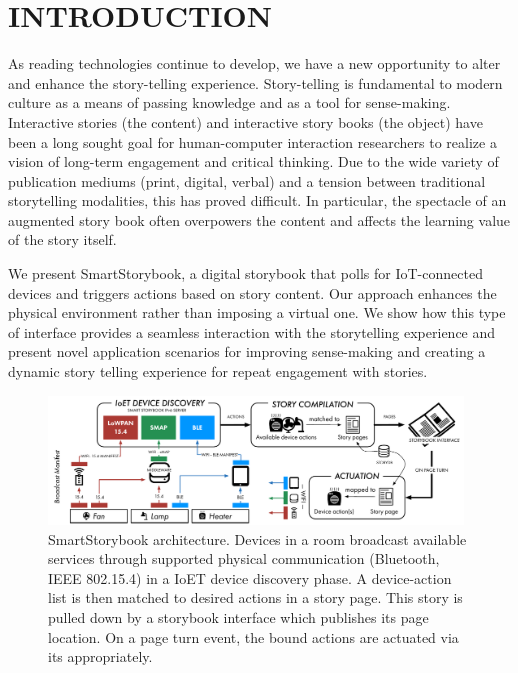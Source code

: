 \documentclass{sigchi}
\newcommand\name{SmartStorybook}
\newcommand\namesp{SmartStorybook }
\begin{document}




\newpage
\section{INTRODUCTION}
As reading technologies continue to develop, we have a new opportunity to alter and enhance the story-telling experience. Story-telling is fundamental to modern culture as a means of passing knowledge and as a tool for sense-making. Interactive stories (the content) and interactive story books (the object) have been a long sought goal for human-computer interaction researchers to realize a vision of long-term engagement and critical thinking. Due to the wide variety of publication mediums (print, digital, verbal) and a tension between traditional storytelling modalities, this has proved difficult. In particular, the spectacle of an augmented story book often overpowers the content and affects the learning value of the story itself. 

We present \name, a digital storybook that polls for IoT-connected devices and triggers actions based on story content. Our approach enhances the physical environment rather than imposing a virtual one. We show how this type of interface provides a seamless interaction with the storytelling experience and present novel application scenarios for improving sense-making and creating a dynamic story telling experience for repeat engagement with stories. 
   


  \begin{figure}[th!]
      \centering
      \includegraphics[keepaspectratio, width=0.98\textwidth]{figures/architecture.pdf} 
      \caption{\namesp architecture. Devices in a room broadcast available services through supported physical communication (Bluetooth, IEEE 802.15.4) in a IoET device discovery phase. A device-action list is then matched to desired actions in a story page. This story is pulled down by a storybook interface which publishes its page location. On a page turn event, the bound actions are actuated via its appropriately. }
      \vspace{-4pt}
      \label{fig:architecture} 
    \end{figure}
\end{document}
